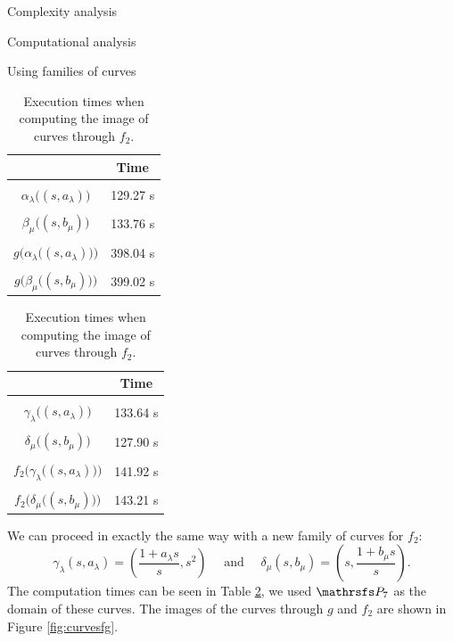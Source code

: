 \documentclass[11pt, a4paper, english, twoside, notitlepage, openright]{report}
\begin{document}
\begin{chapter}{Complexity analysis}
\begin{section}{Computational analysis}
\begin{subsection}{Using families of curves}
\begin{table}[ht!]
\parbox{.45\linewidth}{
\centering
\begin{tabular}{c || c }
 & Time  \\ \hline \hline
\\[-1em]
$\alpha_{\lambda}\big((s,a_\lambda)\big)$ &  129.27 s\\ \hline
\\[-1em]
$\beta_{\mu}\big((s,b_\mu)\big)$ &133.76 s \\ \hline
\\[-1em]
$g\big(\alpha_{\lambda}\big((s,a_\lambda)\big)\big)$ & 398.04 s  \\ \hline
\\[-1em]
$g\big(\beta_{\mu}\big((s,b_\mu)\big)\big)$ & 399.02 s \\
\end{tabular}
\caption{Execution times when computing the image of curves through $g$.}\label{tab:curves1}
}
\hfill
\parbox{.45\linewidth}{
\centering
\begin{tabular}{c || c }
 & Time  \\ \hline \hline
\\[-1em]
$\gamma_{\lambda}\big((s, a_\lambda)\big)$ & 133.64 s \\ \hline
\\[-1em]
$\delta_{\mu}\big((s, b_\mu)\big)$ &127.90 s \\ \hline
\\[-1em]
$f_2\big(\gamma_{\lambda}\big((s, a_\lambda)\big)\big)$ & 141.92 s  \\ \hline
\\[-1em]
$f_2\big(\delta_{\mu}\big((s, b_\mu)\big)\big)$ & 143.21 s \\
\end{tabular}
\caption{Execution times when computing the image of curves through $f_2$.}\label{tab:curves3}
}
\end{table}

We can proceed in exactly the same way with a new family of curves for $f_2$:
$$
\gamma_\lambda(s, a_\lambda) = \left(\frac{1+a_\lambda s}{s}, s^2\right)
\quad \text{ and } \quad
\delta_\mu(s, b_\mu) = \left(s, \frac{1+b_\mu s}{s}\right).
$$
The computation times can be seen in Table \ref{tab:curves3}, we used $\PP_7$ as the domain of these curves. The images of the curves through $g$ and $f_2$ are shown in Figure \ref{fig:curvesfg}. 


\end{subsection}
\end{section}
\end{chapter}
\end{document}
